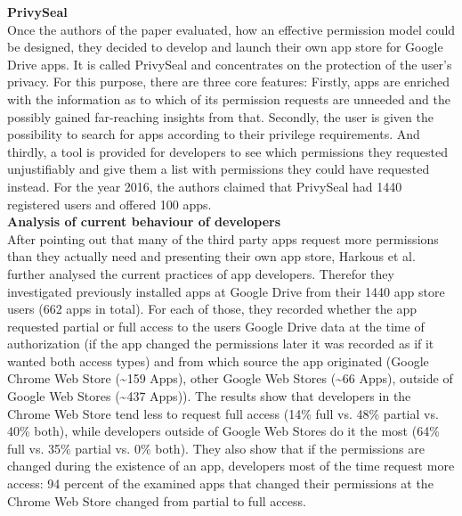 \documentclass[11pt,twocolumn,a4paper,DIV=calc]{scrartcl}
\begin{document}
\textbf{PrivySeal} \\
Once the authors of the paper evaluated, how an effective permission model could be designed, they decided to develop and launch their own app store for Google Drive apps. It is called PrivySeal and concentrates on the protection of the user's privacy. For this purpose, there are three core features: Firstly, apps are enriched with the information as to which of its permission requests are unneeded and the possibly gained far-reaching insights from that. Secondly,  the user is given the possibility to search for apps according to their privilege requirements. And thirdly, a tool is provided for developers to see which permissions they requested unjustifiably and give them a list with permissions they could have requested instead. For the year 2016, the authors claimed that PrivySeal had 1440 registered users and offered 100 apps. \\

\textbf{Analysis of current behaviour of developers} \\
After pointing out that many of the third party apps request more permissions than they actually need and presenting their own app store, Harkous et al. further analysed the current practices of app developers. Therefor they investigated previously installed apps at Google Drive from their 1440 app store users (662 apps in total). For each of those, they recorded whether the app requested partial or full access to the users Google Drive data at the time of authorization (if the app changed the permissions later it was recorded as if it wanted both access types) and from which source the app originated (Google Chrome Web Store (\textasciitilde 159 Apps), other Google Web Stores (\textasciitilde 66 Apps), outside of Google Web Stores (\textasciitilde 437 Apps)). The results show that developers in the Chrome Web Store tend less to request full access (14\% full vs. 48\% partial vs. 40\% both), while developers outside of Google Web Stores do it the most (64\% full vs. 35\% partial vs. 0\% both). They also show that if the permissions are changed during the existence of an app, developers most of the time request more access: 94 percent of the examined apps that changed their permissions at the Chrome Web Store changed from partial to full access. \\ 
\end{document}

